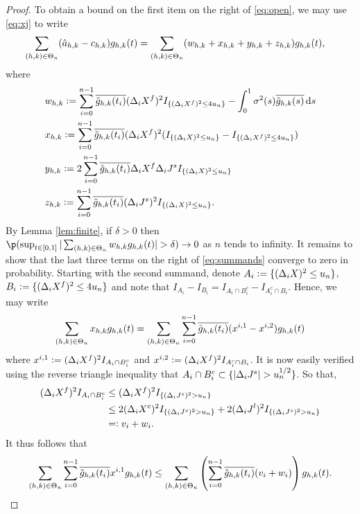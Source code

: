 \begin{proof}
     To obtain a bound on the first item on the right of \eqref{eq:open}, we may use \eqref{eq:xj} to write
    \begin{align}
      \sumt &(\ceen{X} - \cee)\ghk(t)   = \sumt (w_{h,k} + x_{h,k} + y_{h,k} + z_{h,k}) \ghk(t),\label{eq:summands} 
    \end{align}
    where 
    \begin{align}
      &w_{h,k} :=  \sumin \btghki  (\dxf)^2 \indxff - \int^{1}_{0} \sigma^2(s) \btghks \D s \notag\\
      &x_{h,k} :=  \sumin \btghki(\dxf)^2 (\indx - \indxff) \notag\\
      &y_{h,k}  := 2 \sumin \btghki\dxf \djt \indx \notag \\
      &z_{h,k} := \sumin \btghki(\djt)^2\indx.
      \label{}
    \end{align}
    By Lemma \ref{lem:finite}, if $\delta > 0$ then %
      $\p(\sup_{t \in [0,1]}\vert \sumt w_{h,k} \ghk(t) \vert > \delta) \to 0$ %
    as $n$ tends to infinity.  It remains to show that the last three terms on the right of \eqref{eq:summands} converge to zero in probability. Starting with the second summand, denote $A_i := \{(\dx)^2 \le u_n\}$,  $B_i   := \{(\dxf)^2 \le 4 u_n\}$ and note that $I_{A_i} - I_{B_i} = I_{A_i \cap B_i^c} - I_{A^c_i\cap B_i}$.  Hence, we may write 
    \begin{align}
      \sumt x_{h, k} \ghk(t) = \sumt \sumin \btghki (x^{i, 1} - x^{i, 2}) \ghk(t)  \notag
      \label{}
    \end{align}
   where $ x^{i, 1}  := (\dxf)^2 I_{A_i \cap B_i^c}$ and  $x^{i, 2} := (\dxf)^2I_{A^c_i\cap B_i}$.  
    It is now easily verified using the  reverse triangle inequality that   $A_i \cap B_i^c \subset \{\vert \djt \vert > u_n^{1/2}\}$. So that, 
    \begin{align}
      (\dxf)^2 I_{A_i \cap B_i^c} &\le (\dxf)^2 I_{\{(\djt)^2 > u_n\}}\\
       & \le 2 (\dxc)^2 I_{\{(\djt)^2 > u_n\}}
       + 2 (\djl)^2 I_{\{(\djt)^2 > u_n\}}\notag\\
       & =: v_i + w_i. 
      \label{eq:longineq}
    \end{align}
    It thus follows that   
    \begin{align}
      \sumt \sumin \btghki x^{i,1} \ghk(t) \le \sumt \left(\sumin \btghki (v_i + w_i) \right) \ghk(t). \notag 
  \end{align}

\end{proof}
